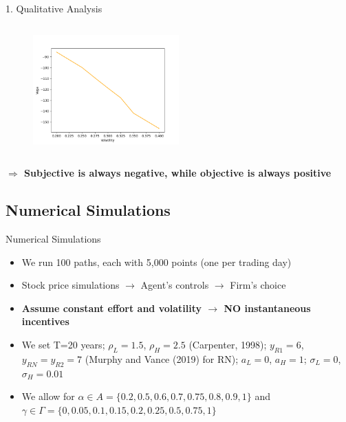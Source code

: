 \documentclass[compress]{beamer}
\begin{document}
\begin{frame}{1. Qualitative Analysis}
\begin{columns}[c]
\begin{column}{0.5\textwidth}
\begin{figure}[!h]
            \end{figure}
            \begin{figure}[!h]
                \centering
                \includegraphics[width=0.5\textwidth]{../fig/4/r_vega_subj.png}
            \end{figure}
        \end{column}
    \end{columns}
    \vspace*{\fill}
    \textbf{ $\Rightarrow$ Subjective is always negative, while objective is always positive }
\end{frame}

\subsection{Numerical Simulations}
\begin{frame}{Numerical Simulations}
    \begin{itemize}
        \item We run 100 paths, each with 5,000 points (one per trading day)
        \item Stock price simulations $\rightarrow$ Agent's controls $\rightarrow$ Firm's choice
        \item \textbf{Assume constant effort and volatility $\rightarrow$ NO instantaneous incentives}
        \item We set T=20 years; $\rho_L = 1.5$, $\rho_H = 2.5$ (Carpenter, 1998); $y_{R1} = 6$, $y_{RN} = y_{R2} = 7$ (Murphy and Vance (2019) for RN); $a_L = 0$, $a_H = 1$; $\sigma_L = 0$, $\sigma_H = 0.01$
        \item We allow for $\alpha \in A = \{0.2, 0.5, 0.6, 0.7, 0.75, 0.8, 0.9, 1\}$ and $\gamma \in \Gamma = \{0, 0.05, 0.1, 0.15, 0.2, 0.25, 0.5, 0.75, 1\}$
    \end{itemize}
\end{frame}
\end{document}
